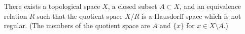 There exists a topological space $X$, a closed subset $A \subset X$, and an equivalence relation $R$ such that the quotient space $X / R$ is a Hausdorff space which is not regular. (The members of the quotient space are $A$ and $\{x\}$ for $x \in X \setminus A$.)
